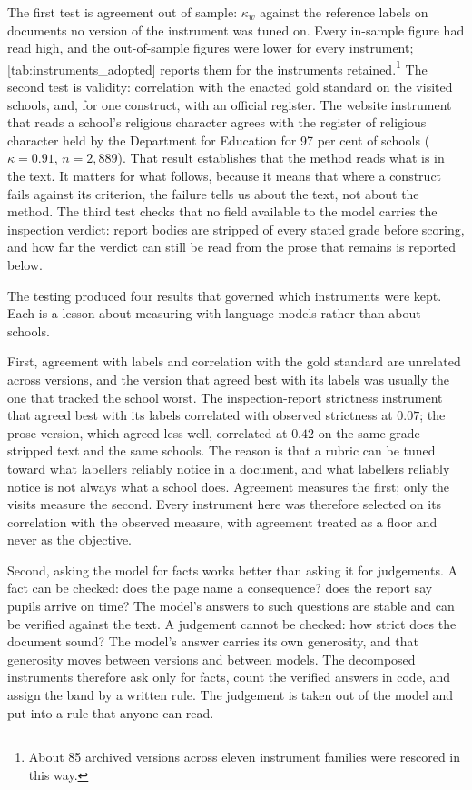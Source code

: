 The first test is agreement out of sample: $\kappa_w$ against the reference
labels on documents no version of the instrument was tuned on. Every
in-sample figure had read high, and the out-of-sample figures were lower for
every instrument; \cref{tab:instruments_adopted} reports them for the
instruments retained.\footnote{About 85 archived versions across eleven
instrument families were rescored in this way.} The second test is validity:
correlation with the enacted gold standard on the visited schools, and, for
one construct, with an official register. The website instrument that reads a
school's religious character agrees with the register of religious character
held by the Department for Education for 97 per cent of schools
($\kappa = 0.91$, $n = 2{,}889$). That result establishes that the method
reads what is in the text. It matters for what follows, because it means that
where a construct fails against its criterion, the failure tells us about the
text, not about the method. The third test checks that no field available to
the model carries the inspection verdict: report bodies are stripped of every
stated grade before scoring, and how far the verdict can still be read from
the prose that remains is reported below.



The testing produced four results that governed which instruments were kept.
Each is a lesson about measuring with language models rather than about
schools.

First, agreement with labels and correlation with the gold standard are
unrelated across versions, and the version that agreed best with its labels
was usually the one that tracked the school worst. The inspection-report
strictness instrument that agreed best with its labels correlated with
observed strictness at $0.07$; the prose version, which agreed less well,
correlated at $0.42$ on the same grade-stripped text and the same schools.
The reason is that a rubric can be tuned toward what labellers reliably
notice in a document, and what labellers reliably notice is not always what
a school does. Agreement measures the first; only the visits measure the
second. Every instrument here was therefore selected on its correlation with
the observed measure, with agreement treated as a floor and never as the
objective.

Second, asking the model for facts works better than asking it for
judgements. A fact can be checked: does the page name a consequence? does the
report say pupils arrive on time? The model's answers to such questions are
stable and can be verified against the text. A judgement cannot be checked:
how strict does the document sound? The model's answer carries its own
generosity, and that generosity moves between versions and between models.
The decomposed instruments therefore ask only for facts, count the verified
answers in code, and assign the band by a written rule. The judgement is
taken out of the model and put into a rule that anyone can read.

